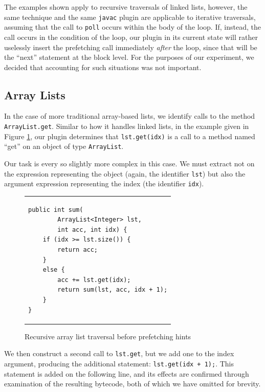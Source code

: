 \documentclass[journal]{IEEEtran}
\begin{document}
The examples shown apply to recursive traversals of linked lists, however, the same technique and the same \texttt{javac} plugin are applicable to iterative traversals, assuming that the call to \texttt{poll} occurs within the body of the loop. If, instead, the call occurs in the condition of the loop, our plugin in its current state will rather uselessly insert the prefetching call immediately \textit{after} the loop, since that will be the ``next'' statement at the block level. For the purposes of our experiment, we decided that accounting for such situations was not important.

\subsection{Array Lists}

In the case of more traditional array-based lists, we identify calls to the method \texttt{ArrayList.get}. Similar to how it handles linked lists, in the example given in Figure \ref{fig:alBefore}, our plugin determines that \lstinline{lst.get(idx)} is a call to a method named ``get'' on an object of type \texttt{ArrayList}.

Our task is every so slightly more complex in this case. We must extract not on the expression representing the object (again, the identifier \texttt{lst}) but also the argument expression representing the index (the identifier \texttt{idx}).

\begin{figure}[h]
{\begin{tabular}{@{\hspace{1.5em}}l}
\begin{lstlisting}
public int sum(
        ArrayList<Integer> lst,
        int acc, int idx) {
    if (idx >= lst.size()) {
        return acc;
    }
    else {
        acc += lst.get(idx);
        return sum(lst, acc, idx + 1);
    }
}
\end{lstlisting}
\end{tabular}}
\caption{\small Recursive array list traversal before prefetching hints}
\label{fig:alBefore}
\end{figure}

We then construct a second call to \texttt{lst.get}, but we add one to the index argument, producing the additional statement: \lstinline{lst.get(idx + 1);}. This statement is added on the following line, and its effects are confirmed through examination of the resulting bytecode, both of which we have omitted for brevity.
\end{document}
